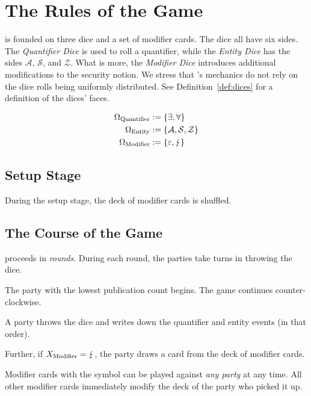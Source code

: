 \documentclass{llncs}
\begin{document}
\section{The Rules of the Game}
\ucftw is founded on three dice and a set of modifier cards.
The dice all have six sides.
The \emph{Quantifier Dice} is used to roll a quantifier, while the \emph{Entity Dice} has the sides $\mathcal{A}$, $\mathcal{S}$, and $\mathcal{Z}$.
What is more, the \emph{Modifier Dice} introduces additional modifications to the security notion.
We stress that \ucftw's mechanics do not rely on the dice rolls being uniformly distributed.
See Definition~\ref{def:dices} for a definition of the dices' faces.
\begin{definition}
	\begin{align*}
		\Omega_\text{Quantifier} &:= \{\exists, \forall\}  \\
		\Omega_\text{Entity} &:= \{\mathcal{A}, \mathcal{S}, \mathcal{Z}\}  \\
		\Omega_\text{Modifier} &:= \{\varepsilon, \lightning\} 
	\end{align*}
	\label{def:dices}
\end{definition}

\subsection{Setup Stage}
During the setup stage, the deck of modifier cards is shuffled.

\subsection{The Course of the Game}
\ucftw proceeds in \emph{rounds}.
During each round, the parties take turns in throwing the dice.

\begin{theorem}
	The party with the lowest publication count begins. The game continues counter-clockwise.
\end{theorem}

A party throws the dice and writes down the quantifier and entity events (in that order).


Further, if $X_\text{Modifier} = \lightning$, the party draws a card from the deck of modifier cards. 

\begin{theorem}
	Modifier cards with the \stopsign symbol can be played against \emph{any party} at any time.
	All other modifier cards immediately modify the deck of the party who picked it up. 
\end{theorem}
\end{document}
